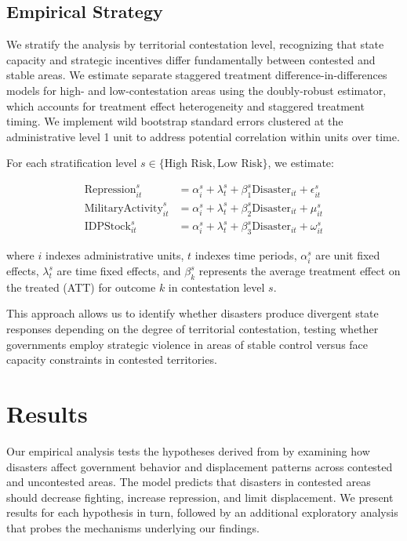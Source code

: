 \documentclass[bibtex]{article}
\begin{document}
\subsection*{Empirical Strategy}

We stratify the analysis by territorial contestation level, recognizing that state capacity and strategic incentives differ fundamentally between contested and stable areas. We estimate separate staggered treatment difference-in-differences models for high- and low-contestation areas using the \citet{callaway_santanna2021} doubly-robust estimator, which accounts for treatment effect heterogeneity and staggered treatment timing. We implement wild bootstrap standard errors clustered at the administrative level 1 unit to address potential correlation within units over time.

For each stratification level $s \in \{\text{High Risk}, \text{Low Risk}\}$, we estimate:

\begin{align}
\text{Repression}_{it}^{s} &= \alpha_i^{s} + \lambda_t^{s} + \beta_1^{s} \text{Disaster}_{it} + \epsilon_{it}^{s} \label{eq:repression}\\
\text{MilitaryActivity}_{it}^{s} &= \alpha_i^{s} + \lambda_t^{s} + \beta_2^{s} \text{Disaster}_{it} + \mu_{it}^{s} \label{eq:military} \\
\text{IDPStock}_{it}^{s} &= \alpha_i^{s} + \lambda_t^{s} + \beta_3^{s} \text{Disaster}_{it} + \omega_{it}^{s} \label{eq:idp}
\end{align}

\noindent where $i$ indexes administrative units, $t$ indexes time periods, $\alpha_i^{s}$ are unit fixed effects, $\lambda_t^{s}$ are time fixed effects, and $\beta_k^{s}$ represents the average treatment effect on the treated (ATT) for outcome $k$ in contestation level $s$.

This approach allows us to identify whether disasters produce divergent state responses depending on the degree of territorial contestation, testing whether governments employ strategic violence in areas of stable control versus face capacity constraints in contested territories.

\section*{Results}

{\color{black} Our empirical analysis tests the hypotheses derived from \citet{sun2024strategic} by examining how disasters affect government behavior and displacement patterns across contested and uncontested areas. The model predicts that disasters in contested areas should decrease fighting, increase repression, and limit displacement. We present results for each hypothesis in turn, followed by an additional exploratory analysis that probes the mechanisms underlying our findings.}
\end{document}
